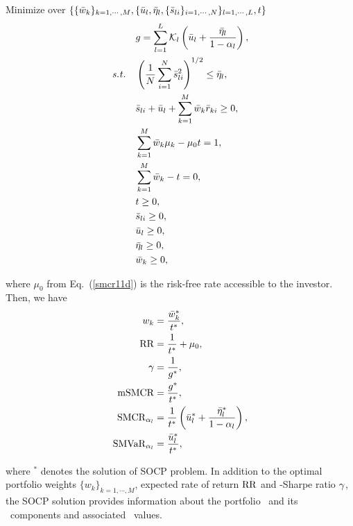 \bigskip
\noindent Minimize over $\{ \{{\bar w}_k\}_{k=1,\cdots,M}, \{ {\bar u}_l, {\bar \eta}_l, \{{\bar s}_{li}\}_{i=1,\cdots,N} \}_{l=1,\cdots,L}, t\}$
\begin{subequations}\label{smcr11}
\begin{align}
    &g = \sum_{l=1}^L \cK_l \left( \bu_l + \frac{\bbeta_l}{1 - \alpha_l}  \right), \label{smcr11a} \\
    \st &\left( \frac{1}{N} \sum_{i=1}^N \bs_{li}^2 \right)^{1/2} \leq \bbeta_l, \label{smcr11b} \\
        &\bs_{li} + \bu_l + \sum_{k=1}^M \bw_k \br_{ki} \geq 0, \label{smcr11c} \\
        &\sum_{k=1}^M \bw_k \mu_k - \mu_0 t = 1, \label{smcr11d} \\
        &\sum_{k=1}^M \bw_k - t = 0, \label{smcr11e} \\
        &t \geq 0, \label{smcr11j} \\
        &\bs_{li} \geq 0, \label{smcr11f} \\
        &\bu_l \geq 0, \label{smcr11i} \\
        &\bbeta_l \geq 0, \label{smcr11h} \\
        &\bw_k \geq 0, \label{smcr11g}
\end{align}
\end{subequations}

\noindent where $\mu_0$ from Eq.~(\ref{smcr11d}) is the risk-free rate accessible to the investor.
Then, we have
\begin{subequations}\label{smcr12}
\begin{align}
    w_k &= \frac{\bw_k^*}{t^*}, \label{smcr12a} \\
    \RR &= \frac{1}{t^*} + \mu_0, \label{smcr12c} \\
    \Sharpe &= \frac{1}{g^*}, \label{smcr12b} \\
    \mSMCR &= \frac{g^*}{t^*} , \label{smcr12d} \\
    \SMCR_{\alpha_l} &= \frac{1}{t^*}\left( \bu_l^* + \frac{\bbeta_l^*}{1-\alpha_l}  \right), \label{smcr12e} \\
    \SMVaR_{\alpha_l} &= \frac{\bu_l^*}{t^*} , \label{smcr12f}
\end{align}
\end{subequations}

\noindent where $^*$ denotes the solution of SOCP problem.
In addition to the optimal portfolio weights $\{w_k\}_{k=1,\cdots,M}$, expected rate of return ${\rm RR}$ and \mSMCR-Sharpe ratio ${\gamma}$,
the SOCP solution provides information about the portfolio \mSMCR\ and its \SMCR\ components and associated \SMVaR\ values.


